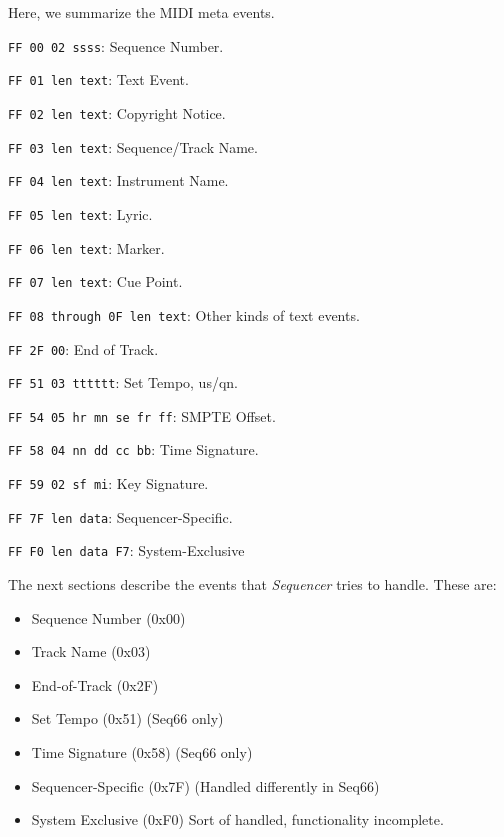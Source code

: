Here, we summarize the MIDI meta events.

   \begin{enumber}
      \item \texttt{FF 00 02 ssss}: Sequence Number.
      \item \texttt{FF 01 len text}: Text Event.
      \item \texttt{FF 02 len text}: Copyright Notice.
      \item \texttt{FF 03 len text}: Sequence/Track Name.
      \item \texttt{FF 04 len text}: Instrument Name.
      \item \texttt{FF 05 len text}: Lyric.
      \item \texttt{FF 06 len text}: Marker.
      \item \texttt{FF 07 len text}: Cue Point.
      \item \texttt{FF 08 through 0F len text}: Other kinds of  text events.
      \item \texttt{FF 2F 00}: End of Track.
      \item \texttt{FF 51 03 tttttt}: Set Tempo, us/qn.
      \item \texttt{FF 54 05 hr mn se fr ff}: SMPTE Offset.
      \item \texttt{FF 58 04 nn dd cc bb}: Time Signature.
      \item \texttt{FF 59 02 sf mi}: Key Signature.
      \item \texttt{FF 7F len data}: Sequencer-Specific.
      \item \texttt{FF F0 len data F7}: System-Exclusive
   \end{enumber}

The next sections describe the events that \textsl{Sequencer} tries to handle.
These are:

   \begin{itemize}
      \item Sequence Number (0x00)
      \item Track Name (0x03)
      \item End-of-Track (0x2F)
      \item Set Tempo (0x51) (Seq66 only)
      \item Time Signature (0x58) (Seq66 only)
      \item Sequencer-Specific (0x7F) (Handled differently in Seq66)
      \item System Exclusive (0xF0) Sort of handled, functionality incomplete.
   \end{itemize}

